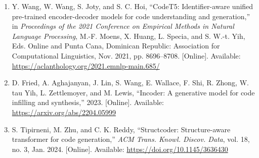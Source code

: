 \documentclass[12pt]{article}
\begin{document}
\begin{enumerate}
\item Y. Wang, W. Wang, S. Joty, and S. C. Hoi, ``CodeT5: Identifier-aware unified pre-trained encoder-decoder models for code understanding and generation,'' in \textit{Proceedings of the 2021 Conference on Empirical Methods in Natural Language Processing}, M.-F. Moens, X. Huang, L. Specia, and S. W.-t. Yih, Eds. Online and Punta Cana, Dominican Republic: Association for Computational Linguistics, Nov. 2021, pp. 8696--8708. [Online]. Available: \url{https://aclanthology.org/2021.emnlp-main.685/}

\item D. Fried, A. Aghajanyan, J. Lin, S. Wang, E. Wallace, F. Shi, R. Zhong, W. tau Yih, L. Zettlemoyer, and M. Lewis, ``Incoder: A generative model for code infilling and synthesis,'' 2023. [Online]. Available: \url{https://arxiv.org/abs/2204.05999}

\item S. Tipirneni, M. Zhu, and C. K. Reddy, ``Structcoder: Structure-aware transformer for code generation,'' \textit{ACM Trans. Knowl. Discov. Data}, vol. 18, no. 3, Jan. 2024. [Online]. Available: \url{https://doi.org/10.1145/3636430}
\end{enumerate}

\newpage

%
\begin{abstract}
Code generation nowadays is producing executable code from natural language descriptions. This paper explores the latest neural approaches to code generation, focusing on how models understand natural language and synthesize structured programs. This paper reviews three papers: CodeT5, InCoder, and StructCoder. Here I am discussing the methodologies, strengths, and limitations of each approach, and how they contribute to advancing the state of the art in code generation. Here CodeT5 presents an identifier-aware encoder-decoder architecture for code understanding and generation. InCoder focuses on code infilling and synthesis through a generative modeling approach. StructCoder adds structure awareness to improve generation quality on code translation and text-to-code tasks.
\end{abstract}

\newpage

\renewcommand{\contentsname}{Table of Contents}
\tableofcontents
\end{document}
